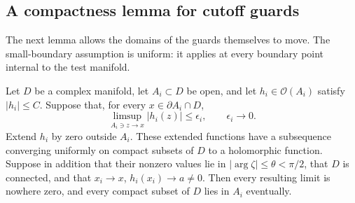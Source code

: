 \subsection{A compactness lemma for cutoff guards}

The next lemma allows the domains of the guards themselves to move. The small-boundary assumption is uniform: it applies at every boundary point internal to the test manifold.

\begin{lemma}\label{lem:quo-cutoff-normal}
Let $D$ be a complex manifold, let $A_i\subset D$ be open, and let $h_i\in\mathcal{O}(A_i)$ satisfy $|h_i|\leq C$. Suppose that, for every $x\in\partial A_i\cap D$,
\[
 \limsup_{A_i\ni z\to x}|h_i(z)|\leq\epsilon_i,
 \qquad \epsilon_i\longrightarrow0.
\]
Extend $h_i$ by zero outside $A_i$. These extended functions have a subsequence converging uniformly on compact subsets of $D$ to a holomorphic function. Suppose in addition that their nonzero values lie in $|\arg\zeta|\leq\theta<\pi/2$, that $D$ is connected, and that $x_i\to x$, $h_i(x_i)\to a\ne0$. Then every resulting limit is nowhere zero, and every compact subset of $D$ lies in $A_i$ eventually.
\end{lemma}
